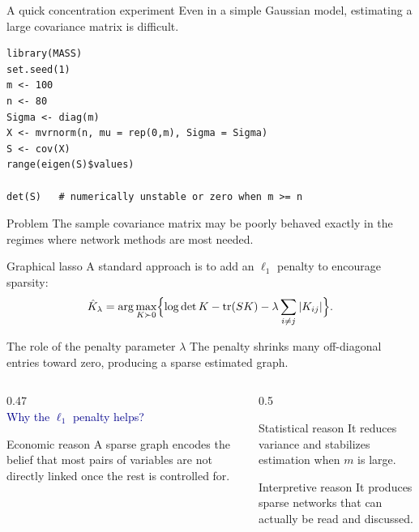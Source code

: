 \documentclass[dvipsnames,aspectratio=169,handout]{beamer}
\begin{document}
\begin{frame}[fragile]{A quick concentration experiment}
Even in a simple Gaussian model, estimating a large covariance matrix is difficult.

\begin{lstlisting}
library(MASS)
set.seed(1)
m <- 100
n <- 80
Sigma <- diag(m)
X <- mvrnorm(n, mu = rep(0,m), Sigma = Sigma)
S <- cov(X)
range(eigen(S)$values)

det(S)   # numerically unstable or zero when m >= n
\end{lstlisting}

\begin{alertblock}{Problem}
The sample covariance matrix may be poorly behaved exactly in the regimes where network methods are most needed.
\end{alertblock}
\end{frame}

\begin{frame}{Graphical lasso}
A standard approach is to add an $\ell_1$ penalty to encourage sparsity:
\[
\hat K_\lambda
=
\arg\max_{K\succ 0}
\Bigl\{\log\det K-\operatorname{tr}(SK)-\lambda\sum_{i\neq j}|K_{ij}|\Bigr\}.
\]

\begin{alertblock}{The role of the penalty parameter $\lambda$}
The penalty shrinks many off-diagonal entries toward zero,
producing a sparse estimated graph.
\end{alertblock}
\begin{columns}[T]
\begin{column}{0.47\textwidth}
\ \\[2mm]
\textcolor{DarkBlue}{\Large Why the $\ell_1$ penalty helps?}\\[3mm]
\begin{block}{Economic reason}
A sparse graph encodes the belief that most pairs of variables are not directly linked once the rest is controlled for.
\end{block}
\end{column}
\begin{column}{0.5\textwidth}
\begin{block}{Statistical reason}
It reduces variance and stabilizes estimation when $m$ is large.
\end{block}
\begin{block}{Interpretive reason}
It produces sparse networks that can actually be read and discussed.
\end{block}
\end{column}
\end{columns}

\end{frame}
\end{document}
